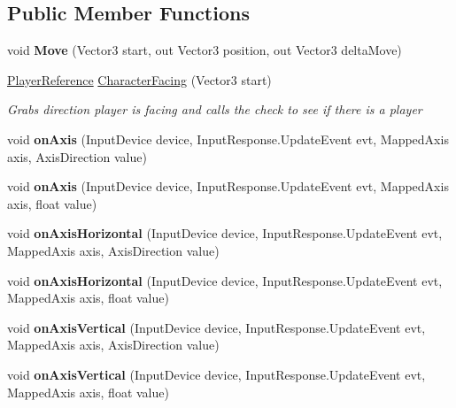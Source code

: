 \subsection*{Public Member Functions}
\begin{DoxyCompactItemize}
\item 
\hypertarget{class_player_input_controller_aa617897cf92c385b734176b3c0f6a51b}{void {\bfseries Move} (Vector3 start, out Vector3 position, out Vector3 delta\-Move)}\label{class_player_input_controller_aa617897cf92c385b734176b3c0f6a51b}

\item 
\hyperlink{class_player_reference}{Player\-Reference} \hyperlink{class_player_input_controller_a509e98602c529b1ca1e391c4ffde100b}{Character\-Facing} (Vector3 start)
\begin{DoxyCompactList}\small\item\em Grabs direction player is facing and calls the check to see if there is a player \end{DoxyCompactList}\item 
\hypertarget{class_player_input_controller_a113e3417863a2d9ab228c795702607b3}{void {\bfseries on\-Axis} (Input\-Device device, Input\-Response.\-Update\-Event evt, Mapped\-Axis axis, Axis\-Direction value)}\label{class_player_input_controller_a113e3417863a2d9ab228c795702607b3}

\item 
\hypertarget{class_player_input_controller_a03be05ea0b3b1085b5633f59a9e131f5}{void {\bfseries on\-Axis} (Input\-Device device, Input\-Response.\-Update\-Event evt, Mapped\-Axis axis, float value)}\label{class_player_input_controller_a03be05ea0b3b1085b5633f59a9e131f5}

\item 
\hypertarget{class_player_input_controller_a9506d4adb70b38fb37a1f8171a53fa2e}{void {\bfseries on\-Axis\-Horizontal} (Input\-Device device, Input\-Response.\-Update\-Event evt, Mapped\-Axis axis, Axis\-Direction value)}\label{class_player_input_controller_a9506d4adb70b38fb37a1f8171a53fa2e}

\item 
\hypertarget{class_player_input_controller_a50f59443aa6b47628893eff83107c93e}{void {\bfseries on\-Axis\-Horizontal} (Input\-Device device, Input\-Response.\-Update\-Event evt, Mapped\-Axis axis, float value)}\label{class_player_input_controller_a50f59443aa6b47628893eff83107c93e}

\item 
\hypertarget{class_player_input_controller_abadac75139e4879a3de5d4e1947faa0e}{void {\bfseries on\-Axis\-Vertical} (Input\-Device device, Input\-Response.\-Update\-Event evt, Mapped\-Axis axis, Axis\-Direction value)}\label{class_player_input_controller_abadac75139e4879a3de5d4e1947faa0e}

\item 
\hypertarget{class_player_input_controller_ad97dbabee4ab8fccc583d38d2cd15447}{void {\bfseries on\-Axis\-Vertical} (Input\-Device device, Input\-Response.\-Update\-Event evt, Mapped\-Axis axis, float value)}\label{class_player_input_controller_ad97dbabee4ab8fccc583d38d2cd15447}

\end{DoxyCompactItemize}
